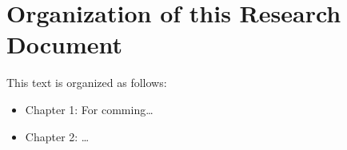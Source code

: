 \section{Organization of this Research Document}
This text is organized as follows:
\begin{itemize}
  \item Chapter 1: For comming\ldots
  \item Chapter 2: \ldots
\end{itemize}

